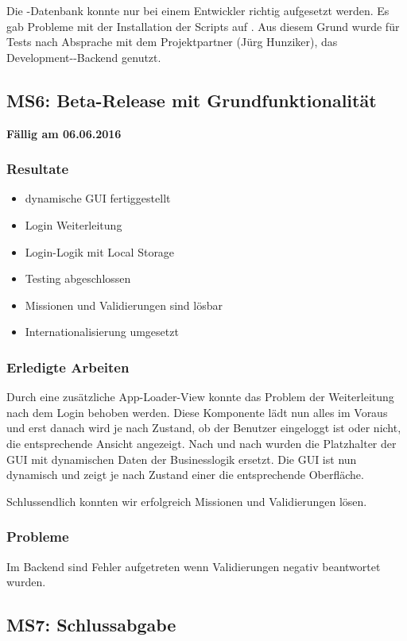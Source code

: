 Die \kort{}-Datenbank konnte nur bei einem Entwickler richtig aufgesetzt werden. 
Es gab Probleme mit der Installation der Scripts auf .
Aus diesem Grund wurde für Tests nach Absprache mit dem Projektpartner (Jürg Hunziker), das Development-\kort{}-Backend genutzt.

\subsection{MS6: Beta-Release mit Grundfunktionalität}
\label{pm-ms6}
\textbf{Fällig am 06.06.2016}
\subsubsection{Resultate}
\begin{itemize}
	\item dynamische \gls{GUI} fertiggestellt
	\item Login Weiterleitung
	\item Login-Logik mit Local Storage
	\item Testing abgeschlossen
	\item Missionen und Validierungen sind lösbar
	\item Internationalisierung umgesetzt
\end{itemize}

\subsubsection{Erledigte Arbeiten}
Durch eine zusätzliche App-Loader-View konnte das Problem der Weiterleitung nach dem Login behoben werden.
Diese Komponente lädt nun alles im Voraus und erst danach wird je nach Zustand, ob der Benutzer eingeloggt ist oder nicht, die entsprechende Ansicht angezeigt.
Nach und nach wurden die Platzhalter der GUI mit dynamischen Daten der Businesslogik ersetzt. 
Die GUI ist nun dynamisch und zeigt je nach Zustand einer  die entsprechende Oberfläche. 

Schlussendlich konnten wir erfolgreich Missionen und Validierungen lösen.


\subsubsection{Probleme}
Im \gls{Backend} sind Fehler aufgetreten wenn Validierungen negativ beantwortet wurden. 


\subsection{MS7: Schlussabgabe}
\label{pm-ms7}

